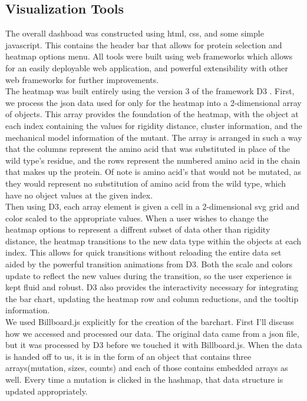 \documentclass[11pt]{IEEEtran}
\begin{document}
\subsection{Visualization Tools}\label{AA}
The overall dashboad was constructed using html, css, and some simple javascript. This contains the header bar that allows for protein selection and heatmap options menu. All tools were built using web frameworks which allows for an easily deployable web application, and powerful extensibility with other web frameworks for further improvements.\\

The heatmap was built entirely using the version 3 of the framework D3 \cite{b7}. First, we process the json data used for only for the heatmap into a 2-dimensional array of objects. This array provides the foundation of the heatmap, with the object at each index containing the values for rigidity distance, cluster information, and the mechanical model information of the mutant. The array is arranged in such a way that the columns represent the amino acid that was substituted in place of the wild type's residue, and the rows represent the numbered amino acid in the chain that makes up the protein. Of note is amino acid's that would not be mutated, as they would represent no substitution of amino acid from the wild type, which have no object values at the given index.\\ 

Then using D3, each array element is given a cell in a 2-dimensional svg grid and color scaled to the appropriate values. When a user wishes to change the heatmap options to represent a diffrent subset of data other than rigidity distance, the heatmap transitions to the new data type within the objects at each index. This allows for quick transitions without reloading the entire data set aided by the powerful transition animations from D3. Both the scale and colors update to reflect the new values during the transition, so the user experience is kept fluid and robust. D3 also provides the interactivity necessary for integrating the bar chart, updating the heatmap row and column reductions, and the tooltip information.\\

We used Billboard.js explicitly for the creation of the barchart. First I'll discuss how we accessed and processed our data. The original data came from a json file, but it was processed by D3 before we touched it with Billboard.js. When the data is handed off to us, it is in the form of an object that contains three arrays(mutation, sizes, counts) and each of those contains embedded arrays as well. Every time a mutation is clicked in the hashmap, that data structure is updated appropriately.\\
\end{document}
